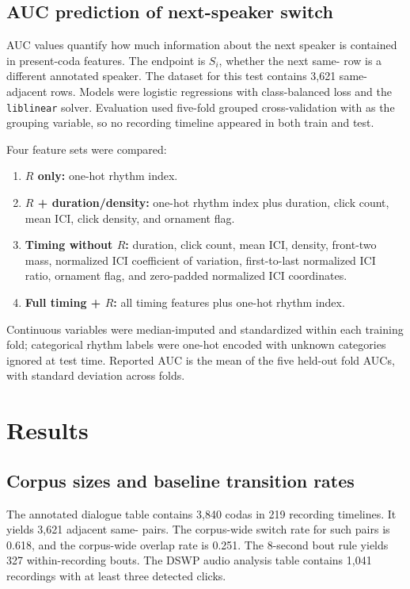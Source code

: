 \documentclass[11pt]{article}
\begin{document}
\subsection{AUC prediction of next-speaker switch}

AUC values quantify how much information about the next speaker is contained in present-coda features. The endpoint is $S_i$, whether the next same- row is a different annotated speaker. The dataset for this test contains 3,621 same- adjacent rows. Models were logistic regressions with class-balanced loss and the \texttt{liblinear} solver. Evaluation used five-fold grouped cross-validation with  as the grouping variable, so no recording timeline appeared in both train and test.

Four feature sets were compared:
\begin{enumerate}
    \item \textbf{$R$ only:} one-hot rhythm index.
    \item \textbf{$R$ + duration/density:} one-hot rhythm index plus duration, click count, mean ICI, click density, and ornament flag.
    \item \textbf{Timing without $R$:} duration, click count, mean ICI, density, front-two mass, normalized ICI coefficient of variation, first-to-last normalized ICI ratio, ornament flag, and zero-padded normalized ICI coordinates.
    \item \textbf{Full timing + $R$:} all timing features plus one-hot rhythm index.
\end{enumerate}
Continuous variables were median-imputed and standardized within each training fold; categorical rhythm labels were one-hot encoded with unknown categories ignored at test time. Reported AUC is the mean of the five held-out fold AUCs, with standard deviation across folds.

\section{Results}

\subsection{Corpus sizes and baseline transition rates}

The annotated dialogue table contains 3,840 codas in 219 recording timelines. It yields 3,621 adjacent same- pairs. The corpus-wide switch rate for such pairs is 0.618, and the corpus-wide overlap rate is 0.251. The 8-second bout rule yields 327 within-recording bouts. The DSWP audio analysis table contains 1,041 recordings with at least three detected clicks.
\end{document}
